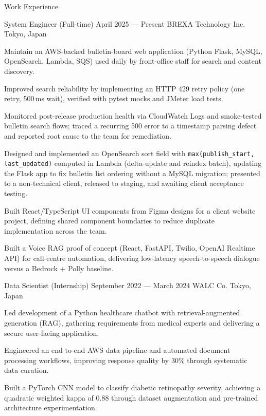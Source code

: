 \begin{rSection}{Work Experience}

    \begin{rWorkExperienceSubsection}
        {System Engineer (Full-time)}
        {April 2025 --- Present}
        {BREXA Technology Inc.}
        {Tokyo, Japan}
        {
            \item Maintain an AWS-backed bulletin-board web application (Python Flask, MySQL, OpenSearch, Lambda, SQS) used daily by front-office staff for search and content discovery.
            \item Improved search reliability by implementing an HTTP 429 retry policy (one retry, 500\,ms wait), verified with pytest mocks and JMeter load tests.
            \item Monitored post-release production health via CloudWatch Logs and smoke-tested bulletin search flows; traced a recurring 500 error to a timestamp parsing defect and reported root cause to the team for remediation.
            \item Designed and implemented an OpenSearch sort field with \texttt{max(publish\_start, last\_updated)} computed in Lambda (delta-update and reindex batch), updating the Flask app to fix bulletin list ordering without a MySQL migration; presented to a non-technical client, released to staging, and awaiting client acceptance testing.
            \item Built React/TypeScript UI components from Figma designs for a client website project, defining shared component boundaries to reduce duplicate implementation across the team.
            \item Built a Voice RAG proof of concept (React, FastAPI, Twilio, OpenAI Realtime API) for call-centre automation, delivering low-latency speech-to-speech dialogue versus a Bedrock + Polly baseline.
        }
    \end{rWorkExperienceSubsection}

    \begin{rWorkExperienceSubsection}
        {Data Scientist (Internship)}
        {September 2022 --- March 2024}
        {WALC Co.}
        {Tokyo, Japan}
        {
            \item Led development of a Python healthcare chatbot with retrieval-augmented generation (RAG), gathering requirements from medical experts and delivering a secure user-facing application.
            \item Engineered an end-to-end AWS data pipeline and automated document processing workflows, improving response quality by 30\% through systematic data curation.
            \item Built a PyTorch CNN model to classify diabetic retinopathy severity, achieving a quadratic weighted kappa of 0.88 through dataset augmentation and pre-trained architecture experimentation.
        }
    \end{rWorkExperienceSubsection}


\end{rSection}
